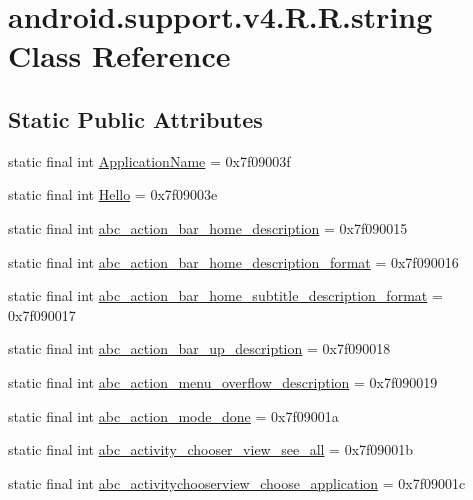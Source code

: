 \hypertarget{classandroid_1_1support_1_1v4_1_1_r_1_1string}{
\section{android.support.v4.R.R.string Class Reference}
\label{classandroid_1_1support_1_1v4_1_1_r_1_1string}
}
\subsection*{Static Public Attributes}
\begin{CompactItemize}
\item 
static final int \hyperlink{classandroid_1_1support_1_1v4_1_1_r_1_1string_7a65ec0f7b2cc19600eb1cfc8edf3b7a}{ApplicationName} = 0x7f09003f
\item 
static final int \hyperlink{classandroid_1_1support_1_1v4_1_1_r_1_1string_f90433d2e5bbdab04f833ab2933904cf}{Hello} = 0x7f09003e
\item 
static final int \hyperlink{classandroid_1_1support_1_1v4_1_1_r_1_1string_b6c645dd9412b1adbb1b8422626c5009}{abc\_\-action\_\-bar\_\-home\_\-description} = 0x7f090015
\item 
static final int \hyperlink{classandroid_1_1support_1_1v4_1_1_r_1_1string_718ca225aa57b8b6ac213927ff5f42b9}{abc\_\-action\_\-bar\_\-home\_\-description\_\-format} = 0x7f090016
\item 
static final int \hyperlink{classandroid_1_1support_1_1v4_1_1_r_1_1string_31e73166dd31fb726d0a2c9d39abe898}{abc\_\-action\_\-bar\_\-home\_\-subtitle\_\-description\_\-format} = 0x7f090017
\item 
static final int \hyperlink{classandroid_1_1support_1_1v4_1_1_r_1_1string_16fc1aa88fd8d65270ac3307aaf32127}{abc\_\-action\_\-bar\_\-up\_\-description} = 0x7f090018
\item 
static final int \hyperlink{classandroid_1_1support_1_1v4_1_1_r_1_1string_0982622376cf5288fa5fbe8be2d4b359}{abc\_\-action\_\-menu\_\-overflow\_\-description} = 0x7f090019
\item 
static final int \hyperlink{classandroid_1_1support_1_1v4_1_1_r_1_1string_8bad71215750c516be741ca395bc451e}{abc\_\-action\_\-mode\_\-done} = 0x7f09001a
\item 
static final int \hyperlink{classandroid_1_1support_1_1v4_1_1_r_1_1string_4beaee4531de7bf57ec5607de9f9ff70}{abc\_\-activity\_\-chooser\_\-view\_\-see\_\-all} = 0x7f09001b
\item 
static final int \hyperlink{classandroid_1_1support_1_1v4_1_1_r_1_1string_a4d7f80f5ee5b54687d06fbb7ee7e540}{abc\_\-activitychooserview\_\-choose\_\-application} = 0x7f09001c

\end{CompactItemize}
